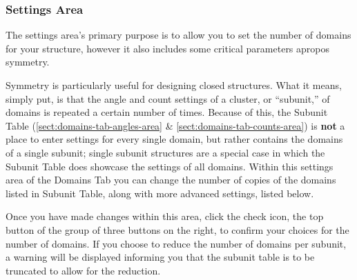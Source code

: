 \documentclass[titlepage]{article}
\begin{document}
\subsubsection{Settings Area} \label{sect:domains-tab-settings-area}

The settings area's primary purpose is to allow you to set the number of domains for your structure, however it also includes some critical parameters apropos symmetry.

Symmetry is particularly useful for designing closed structures. What it means, simply put, is that the angle and count settings of a cluster, or ``subunit,'' of domains is repeated a certain number of times. Because of this, the Subunit Table (\ref{sect:domains-tab-angles-area} \& \ref{sect:domains-tab-counts-area}) is \textbf{not} a place to enter settings for every single domain, but rather contains the domains of a single subunit; single subunit structures are a special case in which the Subunit Table does showcase the settings of all domains. Within this settings area of the Domains Tab you can change the number of copies of the domains listed in Subunit Table, along with more advanced settings, listed below. 

Once you have made changes within this area, click the check icon, the top button of the group of three buttons on the right, to confirm your choices for the number of domains. If you choose to reduce the number of domains per subunit, a warning will be displayed informing you that the subunit table is to be truncated to allow for the reduction.
\end{document}

